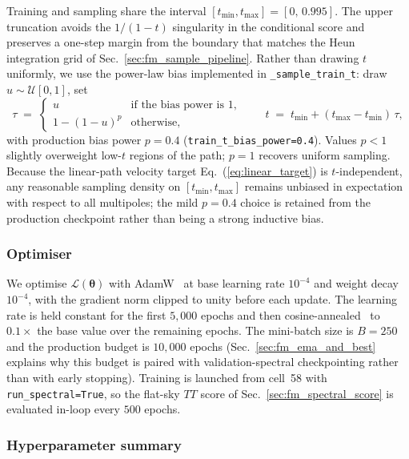 \documentclass[11pt]{article}
\DeclareRobustCommand{\thetavec}{\bm{\theta}}
\theoremstyle{definition}
\begin{document}
Training and sampling share the interval $[t_{\min},t_{\max}]=[0,\,0.995]$. The upper truncation avoids the $1/(1-t)$ singularity in the conditional score and preserves a one-step margin from the boundary that matches the Heun integration grid of Sec.~\ref{sec:fm_sample_pipeline}. Rather than drawing $t$ uniformly, we use the power-law bias implemented in \texttt{\_sample\_train\_t}: draw $u\sim\mathcal U[0,1]$, set
\begin{equation}
  \tau \;=\;
  \begin{cases}
    u & \text{if the bias power is }1,\\[0.3em]
    1-(1-u)^{p} & \text{otherwise,}
  \end{cases}
  \qquad
  t \;=\; t_{\min} + (t_{\max}-t_{\min})\,\tau,
\end{equation}
with production bias power $p=0.4$ (\texttt{train\_t\_bias\_power=0.4}). Values $p<1$ slightly overweight low-$t$ regions of the path; $p=1$ recovers uniform sampling. Because the linear-path velocity target Eq.~(\ref{eq:linear_target}) is $t$-independent, any reasonable sampling density on $[t_{\min},t_{\max}]$ remains unbiased in expectation with respect to all multipoles; the mild $p=0.4$ choice is retained from the production checkpoint rather than being a strong inductive bias.

\subsubsection{Optimiser}

We optimise $\mathcal L(\thetavec)$ with AdamW~\cite{loshchilov2019adamw} at base learning rate $10^{-4}$ and weight decay $10^{-4}$, with the gradient norm clipped to unity before each update. The learning rate is held constant for the first $5{,}000$ epochs and then cosine-annealed~\cite{loshchilov2017sgdr} to $0.1\times$ the base value over the remaining epochs. The mini-batch size is $B=250$ and the production budget is $10{,}000$ epochs (Sec.~\ref{sec:fm_ema_and_best} explains why this budget is paired with validation-spectral checkpointing rather than with early stopping). Training is launched from cell~58 with \texttt{run\_spectral=True}, so the flat-sky $TT$ score of Sec.~\ref{sec:fm_spectral_score} is evaluated in-loop every $500$ epochs.

\subsubsection{Hyperparameter summary}
\end{document}
